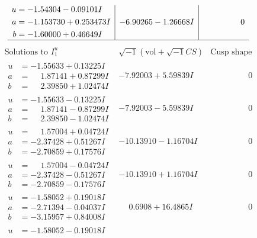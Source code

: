 \documentclass[1p]{elsarticle_modified}
\theoremstyle{definition}
\newcommand{\I}{\sqrt{-1}}
\begin{document}
$$\begin{array}{c|c|c}
\begin{aligned}
u &= -1.54304 - 0.09101 I \\
a &= -1.153730 + 0.253473 I \\
b &= -1.60000 + 0.46649 I\end{aligned}
 & -6.90265 - 1.26668 I & \phantom{-0.000000 } 0\\
 \hline 
 \end{array}$$\newpage$$\begin{array}{c|c|c}  
\text{Solutions to }I^u_{1}& \I (\text{vol} + \sqrt{-1}CS) & \text{Cusp shape}\\
 \hline 
\begin{aligned}
u &= -1.55633 + 0.13225 I \\
a &= \phantom{-}1.87141 + 0.87299 I \\
b &= \phantom{-}2.39850 + 1.02474 I\end{aligned}
 & -7.92003 + 5.59839 I & \phantom{-0.000000 } 0 \\ \hline\begin{aligned}
u &= -1.55633 - 0.13225 I \\
a &= \phantom{-}1.87141 - 0.87299 I \\
b &= \phantom{-}2.39850 - 1.02474 I\end{aligned}
 & -7.92003 - 5.59839 I & \phantom{-0.000000 } 0 \\ \hline\begin{aligned}
u &= \phantom{-}1.57004 + 0.04724 I \\
a &= -2.37428 + 0.51267 I \\
b &= -2.70859 + 0.17576 I\end{aligned}
 & -10.13910 - 1.16704 I & \phantom{-0.000000 } 0 \\ \hline\begin{aligned}
u &= \phantom{-}1.57004 - 0.04724 I \\
a &= -2.37428 - 0.51267 I \\
b &= -2.70859 - 0.17576 I\end{aligned}
 & -10.13910 + 1.16704 I & \phantom{-0.000000 } 0 \\ \hline\begin{aligned}
u &= -1.58052 + 0.19018 I \\
a &= -2.71394 - 0.04037 I \\
b &= -3.15957 + 0.84008 I\end{aligned}
 & \phantom{-}0.6908 + 16.4865 I & \phantom{-0.000000 } 0 \\ \hline\begin{aligned}
u &= -1.58052 - 0.19018 I \\

\end{aligned}
\end{array}$$
\end{document}
